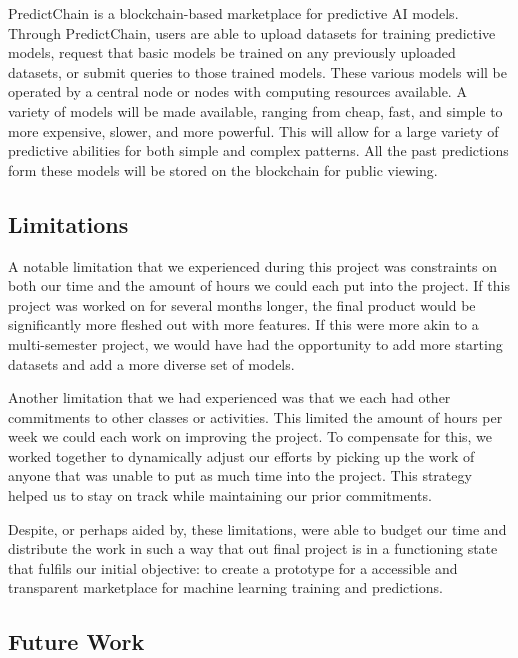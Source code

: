 \documentclass{article}
\begin{document}
    PredictChain is a blockchain-based marketplace for predictive AI models.
    Through PredictChain, users are able to upload datasets for training predictive models, request that basic models
    be trained on any previously uploaded datasets, or submit queries to those trained models.
    These various models will be operated by a central node or nodes with computing resources available. A variety of
    models will be made available, ranging from cheap, fast, and simple to more expensive, slower, and more powerful.
    This will allow for a large variety of predictive abilities for both simple and complex patterns.  All the past predictions
    form these models will be stored on the blockchain for public viewing.

    \subsection{Limitations}

    A notable limitation that we experienced during this project was constraints on both our time and the amount of
    hours we could each put into the project.  If this project was worked on for several months longer, the final product
    would be significantly more fleshed out with more features.  If this were more akin to a multi-semester project,
    we would have had the opportunity to add more starting datasets and add a more diverse set of models.

    Another limitation that we had experienced was that we each had other commitments to other classes or activities.
    This limited the amount of hours per week we could each work on improving the project.  To compensate for this, we
    worked together to dynamically adjust our efforts by picking up the work of anyone that was unable to put as much
    time into the project. This strategy helped us to stay on track while maintaining our prior commitments.

    Despite, or perhaps aided by, these limitations, were able to budget our time and distribute the work in such a way
    that out final project is in a functioning state that fulfils our initial objective: to create a prototype for a
    accessible and transparent marketplace for machine learning training and predictions.

    \subsection{Future Work}
\end{document}

